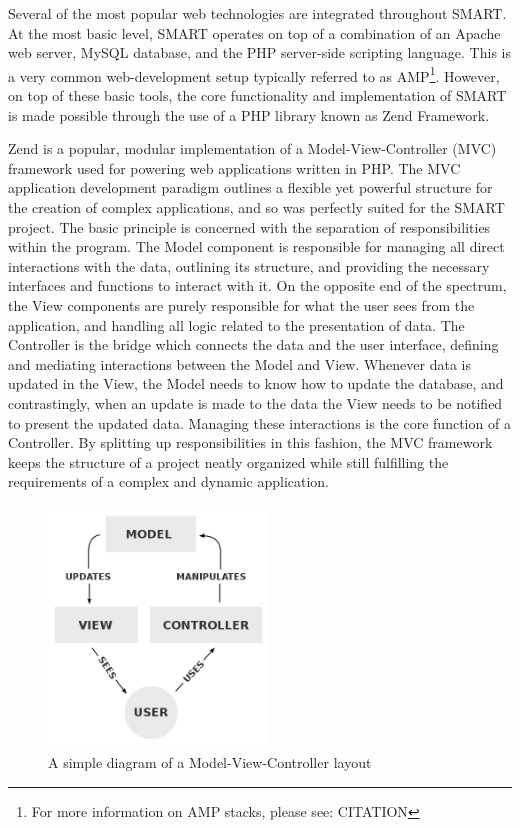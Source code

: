 \documentclass[12pt]{article}
\begin{document}
Several of the most popular web technologies are integrated throughout SMART. At the most basic level, SMART operates on top of a combination of an Apache web server, MySQL database, and the PHP server-side scripting language. This is a very common web-development setup typically referred to as AMP\footnote{For more information on AMP stacks, please see: CITATION}. However, on top of these basic tools, the core functionality and implementation of SMART is made possible through the use of a PHP library known as Zend Framework.

Zend is a popular, modular implementation of a Model-View-Controller (MVC) framework used for powering web applications written in PHP. The MVC application development paradigm outlines a flexible yet powerful structure for the creation of complex applications, and so was perfectly suited for the SMART project. The basic principle is concerned with the separation of responsibilities within the program. The Model component is responsible for managing all direct interactions with the data, outlining its structure, and providing the necessary interfaces and functions to interact with it. On the opposite end of the spectrum, the View components are purely responsible for what the user sees from the application, and handling all logic related to the presentation of data. The Controller is the bridge which connects the data and the user interface, defining and mediating interactions between the Model and View. Whenever data is updated in the View, the Model needs to know how to update the database, and contrastingly, when an update is made to the data the View needs to be notified to present the updated data. Managing these interactions is the core function of a Controller. By splitting up responsibilities in this fashion, the MVC framework keeps the structure of a project neatly organized while still fulfilling the requirements of a complex and dynamic application.

\begin{figure}[h]
    \begin{center}
        \centerline{\includegraphics[width=2.3in]{diagrams/MVC.png}}
    \end{center}
    \begin{spacing}{1.0}\caption{A simple diagram of a Model-View-Controller layout\protect\footnotemark}\end{spacing}
\end{figure}
\end{document}
